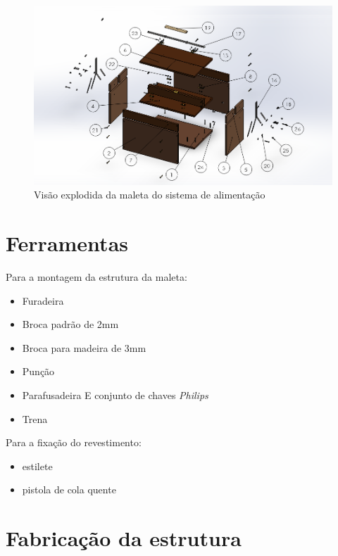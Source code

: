 \begin{figure} [H]
    \centering
    \includegraphics[width=\textwidth]{Figuras/montagemMaletasEstrutura/ignicaoExplodida.png}
    \caption{Visão explodida da maleta do sistema de alimentação}
    \label{fig:ignicaoExplodida}
\end{figure}



\section{Ferramentas}

\par Para a montagem da estrutura da maleta:
\begin{itemize}
    \item Furadeira
    \item Broca padrão de 2mm
    \item Broca para madeira de 3mm
    \item Punção
    \item Parafusadeira E conjunto de chaves \textit{Philips}
    \item Trena
\end{itemize}
\par Para a fixação do revestimento:
\begin{itemize}
    \item estilete
    \item pistola de cola quente
\end{itemize}

\section{Fabricação da estrutura}
